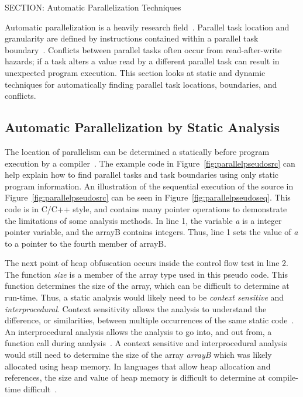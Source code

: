 {SECTION: Automatic Parallelization Techniques


Automatic parallelization is a heavily research field~\cite{hoeflinger:98:uiuccs, blume:1992:pds, Hall:2005wd}. Parallel task location and granularity are defined by instructions contained within a parallel task boundary~\cite{chen:1990:isca}. Conflicts between parallel tasks often occur from read-after-write hazards; if a task alters a value read by a different parallel task can result in unexpected program execution.  This section looks at static and dynamic techniques for automatically finding parallel task locations, boundaries, and conflicts.

\subsection{Automatic Parallelization by Static Analysis}

The location of parallelism can be determined a statically before program execution by a compiler~\cite{bringmann:95:uiuccs,dou:2007:trans}.  The example code in Figure~\ref{fig:parallelpseudosrc} can help explain how to find parallel tasks and task boundaries using only static program information.  An illustration of the sequential execution of the source in Figure~\ref{fig:parallelpseudosrc} can be seen in Figure~\ref{fig:parallelpseudoseq}.  This code is in C/C++ style, and contains many pointer operations to demonstrate the limitations of some analysis methods.  In line 1, the variable \textit{a} is a integer pointer variable, and the arrayB contains integers.  Thus, line 1 sets the value of \textit{a} to a pointer to the fourth member of arrayB.

The next point of heap obfuscation occurs inside the control flow test in line 2. The function \textit{size} is a member of the array type used in this pseudo code.  This function determines the size of the array, which can be difficult to determine at run-time.  Thus, a static analysis would likely need to be \textit{context sensitive} and \textit{interprocedural}.  Context sensitivity allows the analysis to understand the difference, or similarities, between multiple occurrences of the same static code~\cite{emami:94:pldi}.  An interprocedural analysis allows the analysis to go into, and out from, a function call during analysis~\cite{allen:76:cacm}.  A context sensitive and interprocedural analysis would still need to determine the size of the array \textit{arrayB} which was likely allocated using heap memory.  In languages that allow heap allocation and references, the size and value of heap memory is difficult to determine at compile-time difficult~\cite{kong:91:test, muchnick:97:mkp, towle:76:uiuccs}.

}
